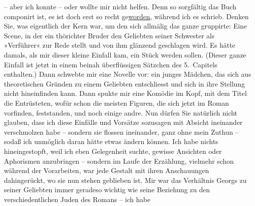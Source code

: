 \begin{ledgroupsized}[t]{13cm}
                    – aber ich konnte – oder wollte mir nicht helfen. Denn so sorgfältig das Buch
                    componirt ist, es ist doch erst so recht ge{\pb}\uline{worden}, während ich es schrieb. Denken Sie, was
                    eigentlich der Kern war, um den sich allmälig das ganze gruppirte: Eine Scene,
                    in der ein thörichter Bruder den Geliebten seiner Schwester als »Verführer« zur
                    Rede stellt und von ihm glänzend geschlagen wird. Es hätte damals, als mir
                    dieser kleine Einfall kam, ein Stück werden sollen. (Dieser ganze Einfall ist
                    jetzt in einem beinah überflüssigen Sätzchen des 5. Capitels enthalten.) Dann
                    schwebte mir eine Novelle vor: ein junges Mädchen, das sich aus theoretischen
                    Gründen zu einem Geliebten entschliesst und sich in ihre Stellung nicht
                    hineinfinden kann. Dann spukte mir eine Komödie im Kopf, mit dem Titel {\pb}die Entrüsteten, wofür schon die meisten Figuren, die
                    sich jetzt im Roman vorfinden, feststanden, und noch einige andre. Nun dürfen
                    Sie natürlich nicht glauben, dass ich diese Einfälle und Vorsätze sozusagen mit
                    Absicht ineinander verschmolzen habe – sondern sie flossen ineinander, ganz ohne
                    mein Zuthun – sodaß ich unmöglich daran hätte etwas ändern können. Ich habe
                    nichts hineingestopft, weil ich eben Gelegenheit suchte, gewisse Ansichten oder
                    Aphorismen anzubringen – sondern im Laufe der Erzählung, vielmehr schon während
                    der Vorarbeiten, war jede Gestalt mit ihren Anschauungen dahingerückt, wo sie
                    nun stehen geblieben ist. Mir war {\pb}das
                    Verhältnis Georgs zu seiner
                    Geliebten immer geradeso wichtig wie seine Beziehung zu den verschiedentlichen
                    Juden des Romans – ich habe

\end{ledgroupsized}
